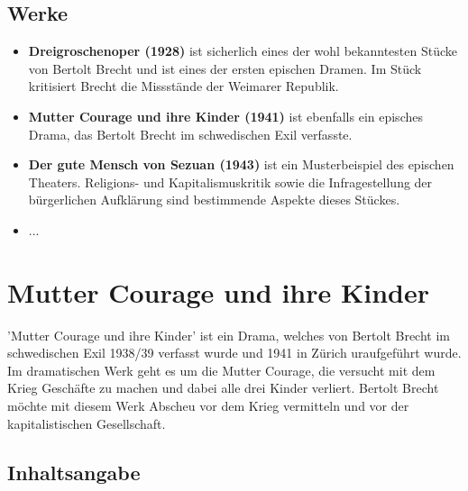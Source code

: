 \documentclass[a4paper]{article}
\begin{document}
	\subsection{Werke}

        \begin{itemize}
        \item \textbf{Dreigroschenoper (1928)} ist sicherlich eines der wohl bekanntesten Stücke von Bertolt Brecht und ist eines der ersten epischen Dramen. Im Stück kritisiert Brecht die Missstände der Weimarer Republik.
        \item \textbf{Mutter Courage und ihre Kinder (1941)} ist ebenfalls ein episches Drama, das Bertolt Brecht im schwedischen Exil verfasste.
        \item \textbf{Der gute Mensch von Sezuan (1943)} ist ein Musterbeispiel des epischen Theaters. Religions- und Kapitalismuskritik sowie die Infragestellung der bürgerlichen Aufklärung sind bestimmende Aspekte dieses Stückes.
        \item ...
        \end{itemize}
        
        \section{Mutter Courage und ihre Kinder}

	'Mutter Courage und ihre Kinder' ist ein Drama, welches von Bertolt Brecht im schwedischen Exil 1938/39 verfasst wurde und 1941 in Zürich uraufgeführt wurde. Im dramatischen Werk geht es um die Mutter Courage, die versucht mit dem Krieg Geschäfte zu machen und dabei alle drei Kinder verliert. Bertolt Brecht möchte mit diesem Werk Abscheu vor dem Krieg vermitteln und vor der kapitalistischen Gesellschaft.
        
	\subsection{Inhaltsangabe}        
\end{document}
